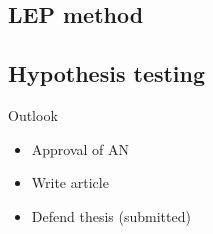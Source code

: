 \documentclass{beamer}
\begin{document}
\subsection{LEP method}


\subsection{Hypothesis testing}


\begin{frame}{Outlook}
  \begin{itemize}
  \item Approval of AN
  \item Write article
  \item Defend thesis (submitted)
  \end{itemize}
\end{frame}

\end{document}
